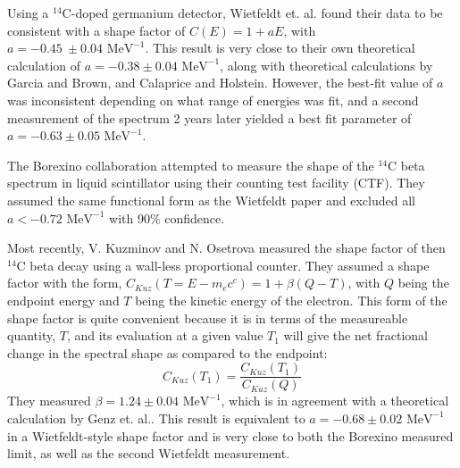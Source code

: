 Using a $^{14}$C-doped germanium detector, Wietfeldt et. al. found their data to be consistent with a shape factor of $C(E)=1+aE$, with $a=-0.45\ \pm0.04 \text{ \ MeV}^{-1}$\cite{C14_Wietfeldt}. This result is very close to their own theoretical calculation of $a=-0.38 \pm 0.04 \text{ \ MeV}^{-1}$, along with theoretical calculations by Garcia and Brown\cite{C14_Garcia}, and  Calaprice and Holstein\cite{beta_Calaprice}. However, the best-fit value of $a$ was inconsistent depending on what range of energies was fit, and a second measurement of the spectrum 2 years later yielded a best fit parameter of $a=-0.63 \pm 0.05 \text{ \ MeV}^{-1}$. 

The Borexino collaboration attempted to measure the shape of the $^{14}$C beta spectrum in liquid scintillator using their counting test facility (CTF). They assumed the same functional form as the Wietfeldt paper and excluded all $a<-0.72 \text{ \ MeV}^{-1}$ with 90\% confidence\cite{C14_Borexino}. 


Most recently, V. Kuzminov and N. Osetrova measured the shape factor of then $^{14}$C beta decay using a wall-less proportional counter\cite{C14_Kuzminov}. They assumed a shape factor with the form, $C_{Kuz}(T=E-m_ec^c)=1+\beta(Q-T)$, with $Q$ being the endpoint energy and $T$ being the kinetic energy of the electron. This form of the shape factor is quite convenient because it is in terms of the measureable quantity, $T$, and its evaluation at a given value $T_1$ will give the net fractional change in the spectral shape as compared to the endpoint:
\begin{equation}
C_{Kuz}(T_1)=\frac{C_{Kuz}(T_1)}{C_{Kuz}(Q)}
\end{equation}
They measured $\beta=1.24 \pm0.04 \text{ \ MeV}^{-1}$, which is in agreement with a theoretical calculation by Genz et. al.\cite{C14_Genz}. This result is equivalent to $a=-0.68 \pm0.02 \text{ \ MeV}^{-1}$ in a Wietfeldt-style shape factor and is very close to both the Borexino measured limit, as well as the second Wietfeldt measurement.

